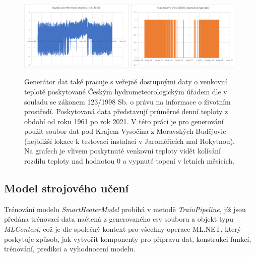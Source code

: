 \pagebreak

\begin{figure}[hbt]
\centering
\includegraphics[width=0.489\textwidth]{obrazky-figures/mlgen_3.png}
\includegraphics[width=0.489\textwidth]{obrazky-figures/mlgen_4.png}
\caption{Generátor dat také pracuje s veřejně dostupnými daty o venkovní teplotě  poskytované Českým hydrometeorologickým úřadem dle \cite{ml-chmu-data} v souladu se zákonem 123/1998 Sb. o právu na informace o životním prostředí. Poskytovaná data představují průměrné denní teploty z období od roku 1961 po rok 2021. V této práci je pro generování použit soubor dat pod Krajem Vysočina z Moravských Budějovic (nejbližší lokace k testovací instalaci v Jaroměřicích nad Rokytnou). Na grafech je vlivem poskytnuté venkovní teploty vidět kolísání rozdílu teploty nad hodnotou 0 a vypnuté topení v letních měsících.}
\end{figure}


\subsection{Model strojového učení}
Trénování modelu {\it SmartHeaterModel} probíhá v metodě {\it TrainPipeline}, jíž jsou předána trénovací data načtená z generovaného csv souboru a objekt typu {\it MLContext}, což je dle \cite{mlnet_context} společný kontext pro všechny operace ML.NET, který poskytuje způsob, jak vytvořit komponenty pro přípravu dat, konstrukci funkcí, trénování, predikci a vyhodnocení modelu.


